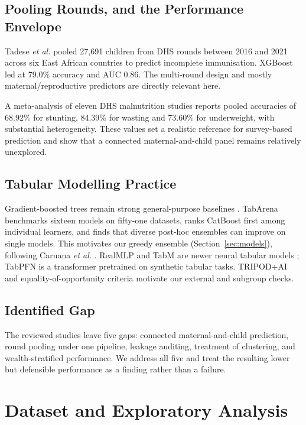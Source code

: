 \documentclass[conference]{IEEEtran}
\begin{document}
\subsection{Pooling Rounds, and the Performance Envelope}
Tadese \textit{et al.} \cite{tadese2024} pooled 27,691 children from DHS rounds
between 2016 and 2021 across six East African countries to predict incomplete
immunisation. XGBoost led at 79.0\% accuracy and AUC 0.86. The multi-round
design and mostly maternal/reproductive predictors are directly relevant here.

A meta-analysis of eleven DHS malnutrition studies \cite{rao2025} reports pooled
accuracies of 68.92\% for stunting, 84.39\% for wasting and 73.60\% for
underweight, with substantial heterogeneity. These values set a realistic
reference for survey-based prediction and show that a connected
maternal-and-child panel remains relatively unexplored.

\subsection{Tabular Modelling Practice}
Gradient-boosted trees remain strong general-purpose baselines
\cite{xgboost,lightgbm,catboost}. TabArena \cite{tabarena} benchmarks sixteen
models on fifty-one datasets, ranks CatBoost first among individual learners,
and finds that diverse post-hoc ensembles can improve on single models. This
motivates our greedy ensemble (Section~\ref{sec:models}), following Caruana
\textit{et al.} \cite{caruana2004}. RealMLP and TabM are newer neural tabular
models \cite{realmlp,tabm}; TabPFN \cite{tabpfn} is a transformer pretrained
on synthetic tabular tasks. TRIPOD+AI \cite{tripod} and equality-of-opportunity
criteria \cite{hardt2016} motivate our external and subgroup checks.

\subsection{Identified Gap}
The reviewed studies leave five gaps: connected maternal-and-child prediction,
round pooling under one pipeline, leakage auditing, treatment of clustering,
and wealth-stratified performance. We address all five and treat the resulting
lower but defensible performance as a finding rather than a failure.

\section{Dataset and Exploratory Analysis}
\end{document}
